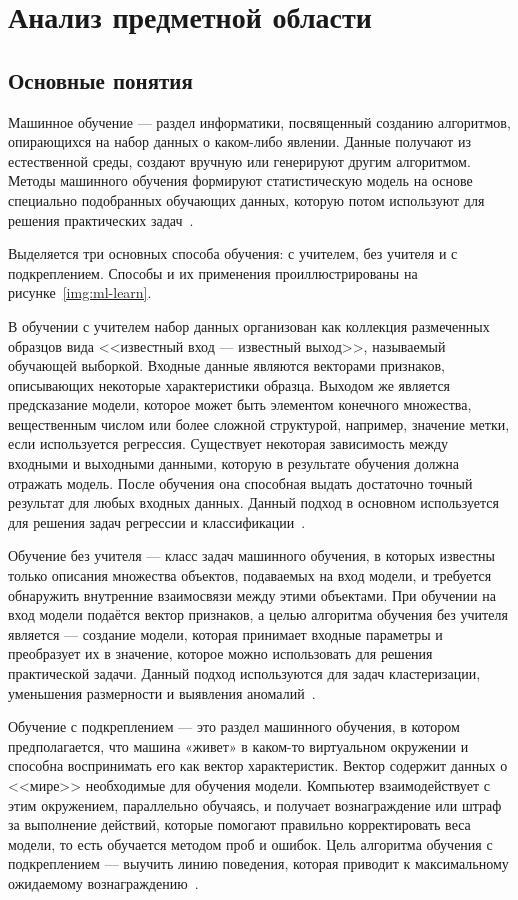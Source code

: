 \chapter{Анализ предметной области}

\section{Основные понятия}
Машинное обучение --- раздел информатики, посвященный созданию алгоритмов, опирающихся на набор данных о каком-либо явлении. Данные получают из естественной среды, создают вручную или генерируют другим алгоритмом. Методы машинного обучения формируют статистическую модель на основе специально подобранных обучающих данных, которую потом используют для решения практических задач~\cite{ML_no_wors}.


Выделяется три основных способа обучения: с учителем, без учителя и с подкреплением. Способы и их применения проиллюстрированы на рисунке~\ref{img:ml-learn}.


В обучении с учителем набор данных организован как коллекция размеченных образцов вида <<известный вход --- известный выход>>, называемый обучающей выборкой.  Входные данные являются векторами признаков, описывающих некоторые характеристики образца. Выходом же является предсказание модели, которое может быть элементом конечного множества, вещественным числом или более сложной структурой, например, значение метки, если используется регрессия. Существует некоторая зависимость между входными и выходными данными, которую в результате обучения должна отражать модель. После обучения она способная выдать достаточно точный результат для любых входных данных. Данный подход в основном используется для решения задач регрессии и классификации~\cite{ML_no_wors}.

Обучение без учителя --- класс задач машинного обучения, в которых известны только описания множества объектов, подаваемых на вход модели, и требуется обнаружить внутренние взаимосвязи между этими объектами. При обучении на вход модели подаётся вектор признаков, а целью алгоритма обучения без учителя является --- создание модели, которая принимает входные параметры и преобразует их в значение, которое можно использовать для решения практической задачи. Данный подход используются для задач кластеризации, уменьшения размерности и выявления аномалий~\cite{ML_no_wors}.

Обучение с подкреплением --- это раздел машинного обучения, в котором предполагается, что машина «живет» в каком-то виртуальном окружении и способна воспринимать его как вектор характеристик. Вектор содержит данных о <<мире>> необходимые для обучения модели. Компьютер взаимодействует с этим окружением, параллельно обучаясь, и получает вознаграждение или штраф за выполнение действий, которые помогают правильно корректировать веса модели, то есть обучается методом проб и ошибок. Цель алгоритма обучения с подкреплением --- выучить линию поведения, которая приводит к максимальному ожидаемому вознаграждению~\cite{ML_no_wors}.

